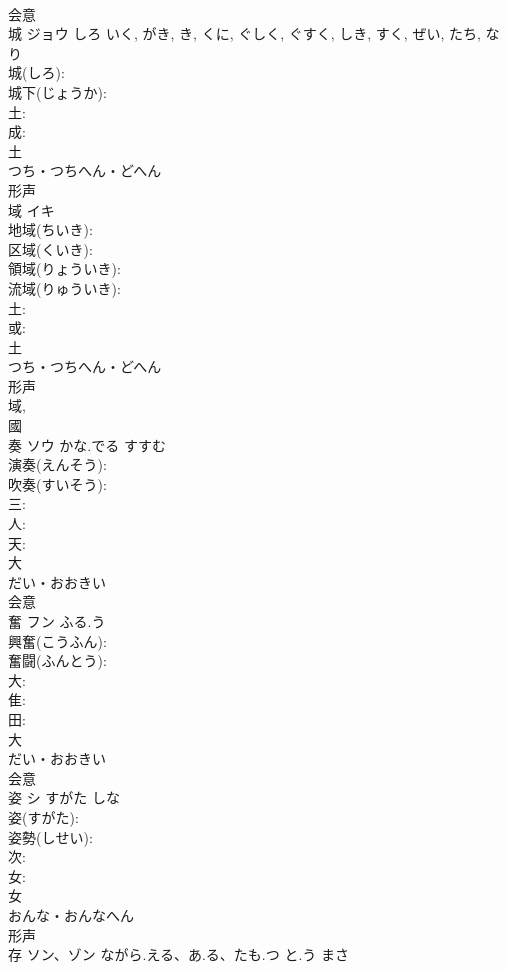 \documentclass[8pt]{extreport}
\begin{document}
\begin{CJK}{UTF8}{min}
\\	会意 
\\	城	ジョウ	しろ	いく, がき, き, くに, ぐしく, ぐすく, しき, すく, ぜい, たち, なり	
\\	城(しろ): 
\\	城下(じょうか): 
\\	土: 
\\	成: 
\\	土	
\\	つち・つちへん・どへん	
\\	形声 
\\	域	イキ			
\\	地域(ちいき): 
\\	区域(くいき): 
\\	領域(りょういき): 
\\	流域(りゅういき): 
\\	土: 
\\	或: 
\\	土	
\\	つち・つちへん・どへん	
\\	形声 
\\	域, 
\\	國 
\\	奏	ソウ	かな.でる	すすむ	
\\	演奏(えんそう): 
\\	吹奏(すいそう): 
\\	三: 
\\	人: 
\\	天: 
\\	大	
\\	だい・おおきい	
\\	会意 
\\	奮	フン	ふる.う		
\\	興奮(こうふん): 
\\	奮闘(ふんとう): 
\\	大: 
\\	隹: 
\\	田: 
\\	大	
\\	だい・おおきい	
\\	会意 
\\	姿	シ	すがた	しな	
\\	姿(すがた): 
\\	姿勢(しせい): 
\\	次: 
\\	女: 
\\	女	
\\	おんな・おんなへん	
\\	形声 
\\	存	ソン、ゾン	ながら.える、あ.る、たも.つ と.う	まさ	

\end{CJK}
\end{document}
